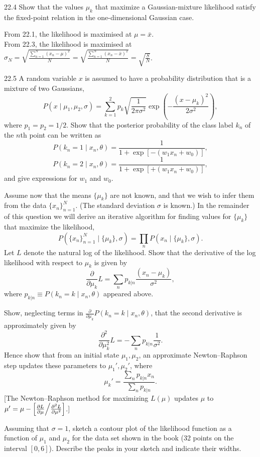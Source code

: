\documentclass[12pt, a4paper]{article}
\begin{document}
\begin{prob}{22.4}
Show that the values $\mu_k$ that maximize a Gaussian-mixture likelihood satisfy the fixed-point relation in the one-dimensional Gaussian case.
\end{prob}
\begin{sol}
From 22.1, the likelihood is maximised at $\mu = \bar{x}$. \\
From 22.3, the likelihood is maximised at $\sigma_N = \sqrt{\frac{\sum_{n=1}^{N}(x_n - \mu)^2}{N}} = \sqrt{\frac{\sum_{n=1}^{N}(x_n - \bar{x})^2}{N}} = \sqrt{\frac{S}{N}}$.
\end{sol}
\bigskip

\begin{prob}{22.5}
A random variable $x$ is assumed to have a probability distribution that is a mixture of two Gaussians,
\[
P(x \mid \mu_1, \mu_2, \sigma) = \sum_{k=1}^2 p_k \sqrt{\frac{1}{2\pi\sigma^2}} \exp\left(-\frac{(x-\mu_k)^2}{2\sigma^2}\right),
\]
where $p_1 = p_2 = 1/2$. Show that the posterior probability of the class label $k_n$ of the $n$th point can be written as
\[
P(k_n = 1 \mid x_n, \theta) = \frac{1}{1 + \exp[-(w_1 x_n + w_0)]},
\]
\[
P(k_n = 2 \mid x_n, \theta) = \frac{1}{1 + \exp[+(w_1 x_n + w_0)]},
\]
and give expressions for $w_1$ and $w_0$.

Assume now that the means $\{\mu_k\}$ are not known, and that we wish to infer them from the data $\{x_n\}_{n=1}^N$. (The standard deviation $\sigma$ is known.) In the remainder of this question we will derive an iterative algorithm for finding values for $\{\mu_k\}$ that maximize the likelihood,
\[
P(\{x_n\}_{n=1}^N \mid \{\mu_k\}, \sigma) = \prod_n P(x_n \mid \{\mu_k\}, \sigma).
\]
Let $L$ denote the natural log of the likelihood. Show that the derivative of the log likelihood with respect to $\mu_k$ is given by
\[
\frac{\partial}{\partial \mu_k} L = \sum_n p_{k|n} \frac{(x_n - \mu_k)}{\sigma^2},
\]
where $p_{k|n} \equiv P(k_n = k \mid x_n, \theta)$ appeared above.

Show, neglecting terms in $\frac{\partial}{\partial \mu_k} P(k_n = k \mid x_n, \theta)$, that the second derivative is approximately given by
\[
\frac{\partial^2}{\partial \mu_k^2} L = -\sum_n p_{k|n} \frac{1}{\sigma^2}.
\]
Hence show that from an initial state $\mu_1, \mu_2$, an approximate Newton--Raphson step updates these parameters to $\mu_1', \mu_2'$, where
\[
\mu_k' = \frac{\sum_n p_{k|n} x_n}{\sum_n p_{k|n}}.
\]
[The Newton--Raphson method for maximizing $L(\mu)$ updates $\mu$ to $\mu' = \mu - \left[\frac{\partial L}{\partial \mu} \middle/ \frac{\partial^2 L}{\partial \mu^2}\right]$.]

Assuming that $\sigma = 1$, sketch a contour plot of the likelihood function as a function of $\mu_1$ and $\mu_2$ for the data set shown in the book (32 points on the interval $[0, 6]$). Describe the peaks in your sketch and indicate their widths.
\end{prob}
\end{document}
